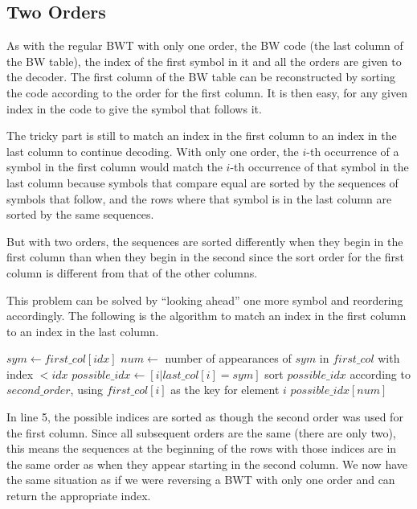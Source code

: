 \documentclass[a4paper]{scrreprt}
\begin{document}
\subsection{Two Orders}

As with the regular BWT with only one order, the BW code (the last column of
the BW table), the index of the first symbol in it and all the orders are given
to the decoder. The first column of the BW table can be reconstructed by sorting
the code according to the order for the first column. It is then easy, for any
given index in the code to give the symbol that follows it.

The tricky part is still to match an index in the first column to an index in
the last column to continue decoding. With only one order, the \(i\)-th
occurrence of a symbol in the first column would match the \(i\)-th occurrence
of that symbol in the last column because symbols that compare equal are sorted
by the sequences of symbols that follow, and the rows where that symbol is in
the last column are sorted by the same sequences.

But with two orders, the sequences are sorted differently when they begin in the
first column than when they begin in the second since the sort order for the
first column is different from that of the other columns.

This problem can be solved by ``looking ahead'' one more symbol and reordering
accordingly. The following is the algorithm to match an index in the first
column to an index in the last column.

\begin{algorithmic}[1]
\State $sym \gets first\_col[idx]$
\State $num \gets$ number of appearances of $sym$ in $first\_col$ with index $<
idx$
\State $possible\_idx \gets [i | last\_col[i] = sym]$
\State sort $possible\_idx$ according to $second\_order$, using $first\_col[i]$
as the key for element $i$
\State \Return $possible\_idx[num]$
\EndProcedure
\end{algorithmic}

In line 5, %
the possible indices are sorted as though the second order was used for the
first column. Since all subsequent orders are the same (there are only two),
this means the sequences at the beginning of the rows with those indices are in
the same order as when they appear starting in the second column. We now have
the same situation as if we were reversing a BWT with only one order and can
return the appropriate index.
\end{document}
